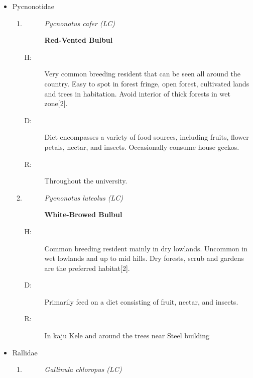 \begin{itemize}
\begin{enumerate}
\begin{description}
\item[R: ]%
Surrounding areas of university playground and Ceremonial courtyard.%
\end{description}%
\end{enumerate}%
\item%
Pycnonotidae%
\begin{enumerate}%
\item%
\begin{description}%
\item[]%
\textit{Pycnonotus cafer (LC)}%
\item[]%
\textbf{Red{-}Vented Bulbul}%
\end{description}%
\begin{description}%
\item[H: ]%
Very common breeding resident that can be seen all around the country. Easy to spot in forest fringe, open forest, cultivated lands and trees in habitation.  Avoid interior of thick forests in wet zone{[}2{]}.%
\item[D: ]%
Diet encompasses a variety of food sources, including fruits, flower petals, nectar, and insects. Occasionally consume house geckos.%
\item[R: ]%
Throughout the university.%
\end{description}%
\item%
\begin{description}%
\item[]%
\textit{Pycnonotus luteolus (LC)}%
\item[]%
\textbf{White{-}Browed Bulbul}%
\end{description}%
\begin{description}%
\item[H: ]%
Common breeding resident mainly in dry lowlands. Uncommon in wet lowlands and up to mid hills. Dry forests, scrub and gardens are the preferred habitat{[}2{]}.%
\item[D: ]%
Primarily feed on a diet consisting of fruit, nectar, and insects.%
\item[R: ]%
In kaju Kele and around the trees near Steel building%
\end{description}%
\end{enumerate}%
\item%
Rallidae%
\begin{enumerate}%
\item%
\begin{description}%
\item[]%
\textit{Gallinula chloropus (LC)}%
\item[]%

\end{description}
\end{enumerate}
\end{itemize}

